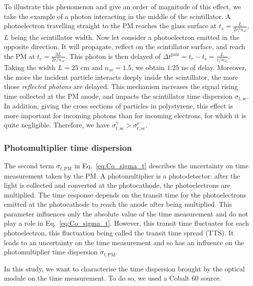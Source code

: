 To illustrate this phenomenon and give an order of magnitude of this effect, we take the example of a photon interacting in the middle of the scintillator.
A photoelectron travelling straight to the PM reaches the glass surface at $t_{s} = \frac{L}{2c/n_{sc}}$, $L$ being the scintillator width.
Now let consider a photoelectron emitted in the opposite direction.
It will propagate, reflect on the scintillator surface, and reach the PM at $t_{r} = \frac{3L}{2c/n_{sc}}$.
This photon is then delayed of $\Delta t^{\text{pair}} = t_{r} - t_{s} = \frac{L}{c/n_{sc}}$.
Taking the width $L=25$ cm and $n_{sc}=1.5$, we obtain $1.25$ ns of delay.
Moreover, the more the incident particle interacts deeply inside the scintillator, the more those \emph{reflected photons} are delayed.
This mechanism increases the signal rising time collected at the PM anode, and impacts the scintillator time dispersion $\sigma_{t,\text{sc}}$.
In addition, giving the cross sections of particles in polystyrene, this effect is more important for incoming photons than for incoming electrons, for which it is quite negligible.
Therefore, we have $\sigma_{t,\text{sc}}^{\gamma}>\sigma_{t,\text{sc}}^{\text{e}^{-}}$.


\subsubsection*{Photomultiplier time dispersion}

The second term $\sigma_{t,\text{PM}}$ in Eq.~\eqref{eq:Co_sigma_t} describes the uncertainty on time measurement taken by the PM.
A photomultiplier is a photodetector: after the light is collected and converted at the photocathode, the photoelectrons are multiplied.
The time response depends on the transit time for the photoelectrons emitted at the photocathode to reach the anode after being multiplied.
This parameter influences only the absolute value of the time measurement and do not play a role in Eq.~\eqref{eq:Co_sigma_t}.
However, this transit time fluctuates for each photoelectron, this fluctuation being called the transit time spread (TTS).
It leads to an uncertainty on the time measurement and so has an influence on the photomultiplier time dispersion $\sigma_{t,\text{PM}}$.
\newline

In this study, we want to characterise the time dispersion brought by the optical module on the time measurement.
To do so, we used a Cobalt $60$ source.



